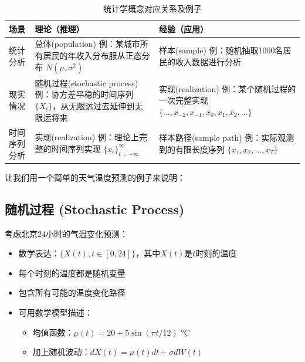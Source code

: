 \begin{table}[htbp]
    \centering
    \begin{tabular}{|p{2.5cm}|p{5cm}|p{5cm}|}
    \hline
    \rowcolor{lightblue}
    \textbf{场景} & \textbf{理论（推理）} & \textbf{经验（应用）} \\
    \hline
    \rowcolor{lightgray}
    统计分析 & 
    总体(population) \newline
    例：某城市所有居民的年收入分布服从正态分布 $N(\mu, \sigma^2)$ & 
    样本(sample) \newline
    例：随机抽取1000名居民的收入数据进行分析 \\
    \hline
    \rowcolor{lightgreen}
    现实情况 & 
    随机过程(stochastic process) \newline
    例：协方差平稳的时间序列 $\{X_t\}$，从无限远过去延伸到无限远将来 & 
    实现(realization) \newline
    例：某个随机过程的一次完整实现 $\{..., x_{-2}, x_{-1}, x_0, x_1, x_2, ...\}$ \\
    \hline
    \rowcolor{lightgreen}
    时间序列分析 & 
    实现(realization) \newline
    例：理论上完整的时间序列实现 $\{x_t\}_{t=-\infty}^{\infty}$ & 
    样本路径(sample path) \newline
    例：实际观测到的有限长度序列 $\{x_1, x_2, ..., x_T\}$ \\
    \hline
    \end{tabular}
    \caption{统计学概念对应关系及例子}
    \label{tab:stats-concepts-examples}
\end{table}


让我们用一个简单的天气温度预测的例子来说明：

\subsection*{随机过程 (Stochastic Process)}
考虑北京24小时的气温变化预测：
\begin{itemize}
    \item 数学表达：$\{X(t), t \in [0, 24]\}$，其中$X(t)$是$t$时刻的温度
    \item 每个时刻的温度都是随机变量
    \item 包含所有可能的温度变化路径
    \item 可用数学模型描述：
    \begin{itemize}
        \item 均值函数：$\mu(t) = 20 + 5\sin(\pi t/12)$ °C
        \item 加上随机波动：$dX(t) = \mu(t)dt + \sigma dW(t)$
    \end{itemize}
\end{itemize}

